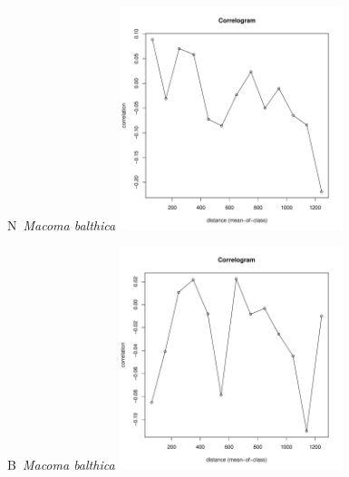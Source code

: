 \documentclass[12pt, a4paper]{disser}
\begin{document}
	\begin{figure}[h]

	\begin{minipage}[b]{.46\linewidth}
	\begin{center}
	{\small N~{\it Macoma balthica}}
		\includegraphics[width=65mm]{../Barenc_Sea/distribution_Moran/Plyazh0812_moran_N_Macoma_balthica_.pdf}
	\end{center}
	\end{minipage}
%
	\hfil %
%
	\begin{minipage}[b]{.46\linewidth}
	\begin{center}
	{\small B~{\it Macoma balthica}}
		\includegraphics[width=65mm]{../Barenc_Sea/distribution_Moran/Plyazh0812_moran_B_Macoma_balthica_.pdf}
	\end{center}
	\end{minipage}


\end{figure}
\end{document}
